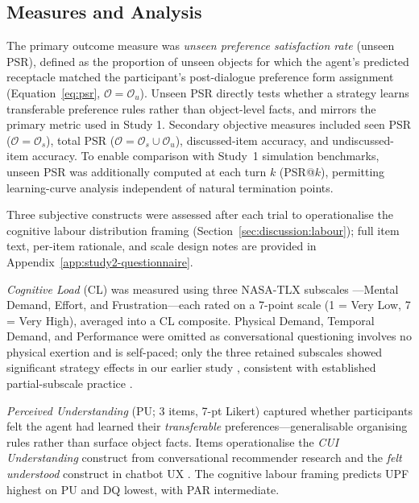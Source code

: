 \documentclass[manuscript,review,anonymous]{acmart}
\begin{document}
\subsection{Measures and Analysis}
\label{sec:study2:measures}

The primary outcome measure was \textit{unseen preference satisfaction rate} (unseen PSR), defined as the proportion of unseen objects for which the agent's predicted receptacle matched the participant's post-dialogue preference form assignment (Equation~\ref{eq:psr}, $\mathcal{O} = \mathcal{O}_u$). Unseen PSR directly tests whether a strategy learns transferable preference rules rather than object-level facts, and mirrors the primary metric used in Study 1. Secondary objective measures included seen PSR ($\mathcal{O} = \mathcal{O}_s$), total PSR ($\mathcal{O} = \mathcal{O}_s \cup \mathcal{O}_u$), discussed-item accuracy, and undiscussed-item accuracy. To enable comparison with Study~1 simulation benchmarks, unseen PSR was additionally computed at each turn $k$ (PSR@$k$), permitting learning-curve analysis independent of natural termination points.

Three subjective constructs were assessed after each trial to operationalise the cognitive labour distribution framing (Section~\ref{sec:discussion:labour}); full item text, per-item rationale, and scale design notes are provided in Appendix~\ref{app:study2-questionnaire}.

\textit{Cognitive Load} (CL) was measured using three NASA-TLX subscales \citep{hart1988development}---Mental Demand, Effort, and Frustration---each rated on a 7-point scale (1 = Very Low, 7 = Very High), averaged into a CL composite. Physical Demand, Temporal Demand, and Performance were omitted as conversational questioning involves no physical exertion and is self-paced; only the three retained subscales showed significant strategy effects in our earlier study \citep{XXX}, consistent with established partial-subscale practice \citep{hart2006nasa,kosch2023survey}. %

\textit{Perceived Understanding} (PU; 3 items, 7-pt Likert) captured whether participants felt the agent had learned their \textit{transferable} preferences---generalisable organising rules rather than surface object facts. Items operationalise the \textit{CUI Understanding} construct from conversational recommender research \citep{chen2024crsque} and the \textit{felt understood} construct in chatbot UX \citep{ashktorab2019resilient}. The cognitive labour framing predicts UPF highest on PU and DQ lowest, with PAR intermediate.
\end{document}
